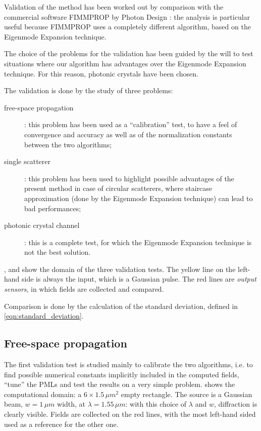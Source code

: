 Validation of the method has been worked out by comparison with the
commercial software FIMMPROP \cite{fimmprop} by Photon
Design \cite{photond}: the analysis is particular
useful because FIMMPROP uses a completely different algorithm, based
on the Eigenmode Expansion technique.

The choice of the problems for the validation has been guided by the
will to test situations where our algorithm has advantages over the
Eigenmode Expansion technique. For this reason, photonic crystals have
been chosen.

The validation is done by the study of three problems:
\begin{description}
\item[free-space propagation]: this problem has been used as a
  ``calibration'' test, to have a feel of convergence and accuracy as
  well as of the normalization constants between the two algorithms;
\item[single scatterer]: this problem has been used to highlight
  possible advantages of the present method in case of circular
  scatterers, where staircase approximation (done by the Eigenmode
  Expansion technique) can lead to bad performances;
\item[photonic crystal channel]: this is a complete test, for which
  the Eigenmode Expansion technique is not the best solution.
\end{description}

,  and
 show the domain of the three validation
tests. The yellow line on the left-hand side is always the input,
which is a Gaussian pulse. The red lines are \emph{output sensors}, in
which fields are collected and compared.

Comparison is done by the calculation of the standard deviation,
defined in \eqref{eqn:standard_deviation}.

\subsection{Free-space propagation} \label{sec:validation_01}

The first validation test is studied mainly to calibrate the two
algorithms, i.e. to find possible numerical constants implicitly
included in the computed fields, ``tune'' the PMLs and test the
results on a very simple problem. 
shows the computational domain: a $6 \times 1.5\,\mu m^2$ empty
rectangle. The source is a Gaussian beam, $w = 1\,\mu m$ width, at
$\lambda = 1.55\,\mu m$: with this choice of $\lambda$ and $w$,
diffraction is clearly visible. Fields are collected on the red lines,
with the most left-hand sided used as a reference for the other one.

